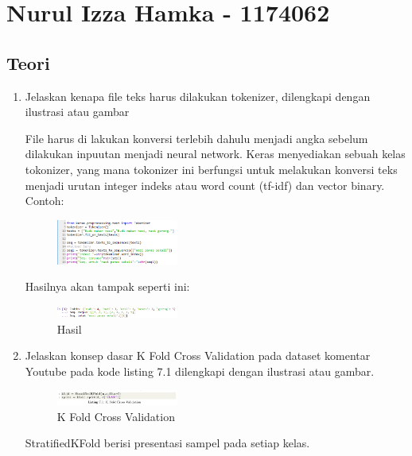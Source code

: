 \section{Nurul Izza Hamka - 1174062}
\subsection{Teori}
\begin{enumerate}

\item Jelaskan kenapa file teks harus dilakukan tokenizer, dilengkapi dengan ilustrasi atau gambar

File harus di lakukan konversi terlebih dahulu menjadi angka sebelum dilakukan inpuutan menjadi neural network. Keras menyediakan sebuah kelas tokonizer, yang mana tokonizer ini berfungsi untuk melakukan konversi teks menjadi urutan integer indeks atau word count (tf-idf) dan vector binary.\\ 
Contoh:\\

\begin{figure}
	\includegraphics[width=4cm]{figures/1174062/7/teori1.png}
	\centering
	\caption{}
\end{figure}

Hasilnya akan tampak seperti ini:\\

\begin{figure}
	\includegraphics[width=4cm]{figures/1174062/7/hasil1.png}
	\centering
	\caption{Hasil}
\end{figure}

\item Jelaskan konsep dasar K Fold Cross Validation pada dataset komentar Youtube pada kode listing 7.1 dilengkapi dengan ilustrasi atau gambar.

\begin{figure}
	\includegraphics[width=4cm]{figures/1174062/7/71.png}
	\centering
	\caption{K Fold Cross Validation}
\end{figure}

StratifiedKFold berisi presentasi sampel pada setiap kelas.


\end{enumerate}
